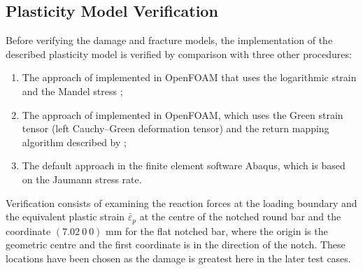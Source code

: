 \documentclass[sn-mathphys,Numbered]{sn-jnl}%
\begin{document}



\subsection{Plasticity Model Verification} \label{PlasticityTestCases}

Before verifying the damage and fracture models, the implementation of the described plasticity model is verified by comparison with three other procedures:
\begin{enumerate}[label=(\alph*)]
	\item The approach of \citet{clancy_improving_2019} implemented in OpenFOAM that uses the logarithmic strain and the Mandel stress \cite{caminero_modeling_2011};
	\item The approach of \citet{cardiff_lagrangian_2017} implemented in OpenFOAM, which uses the Green strain tensor (left Cauchy–Green deformation tensor) and the return mapping algorithm described by \citet{simo_computational_1998};
	\item The default approach in the finite element software Abaqus, which is based on the Jaumann stress rate.
\end{enumerate}

Verification consists of examining the reaction forces at the loading boundary and the equivalent plastic strain $\bar{\varepsilon}_p$ at the centre of the notched round bar and the coordinate $(7.02\ 0\ 0)$ mm for the flat notched bar, where the origin is the geometric centre and the first coordinate is in the direction of the notch.
These locations have been chosen as the damage is greatest here in the later test cases.



\end{document}
